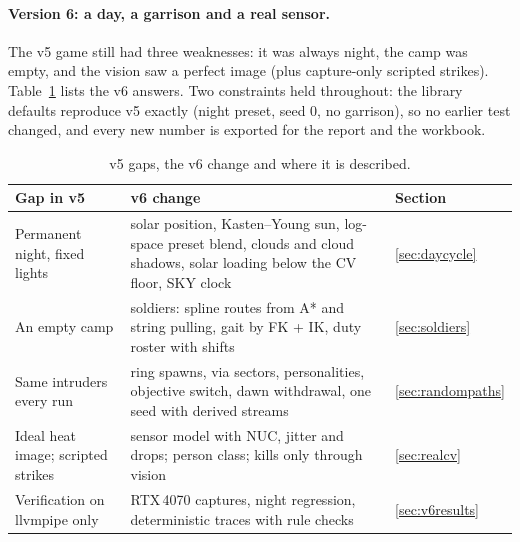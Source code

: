 \paragraph{Version 6: a day, a garrison and a real sensor.} The v5 game still had three weaknesses: it was always night, the camp was empty, and the vision saw a perfect image (plus capture-only scripted strikes). Table~\ref{tab:critsix} lists the v6 answers. Two constraints held throughout: the library defaults reproduce v5 exactly (night preset, seed 0, no garrison), so no earlier test changed, and every new number is exported for the report and the workbook.
\begin{table}[h]
\centering\small
\caption{v5 gaps, the v6 change and where it is described.}\label{tab:critsix}
\begin{tabular}{@{}p{5.6cm}p{7.6cm}p{2.6cm}@{}}
\toprule Gap in v5 & v6 change & Section\\\midrule
Permanent night, fixed lights & solar position, Kasten--Young sun, log-space preset blend, clouds and cloud shadows, solar loading below the CV floor, SKY clock & \ref{sec:daycycle}\\
An empty camp & \nSoldiers{} soldiers: spline routes from A* and string pulling, gait by FK + IK, duty roster with shifts & \ref{sec:soldiers}\\
Same intruders every run & ring spawns, via sectors, personalities, objective switch, dawn withdrawal, one seed with derived streams & \ref{sec:randompaths}\\
Ideal heat image; scripted strikes & sensor model with NUC, jitter and drops; person class; kills only through vision & \ref{sec:realcv}\\
Verification on llvmpipe only & RTX\,4070 captures, night regression, deterministic traces with rule checks & \ref{sec:v6results}\\\bottomrule
\end{tabular}
\end{table}
